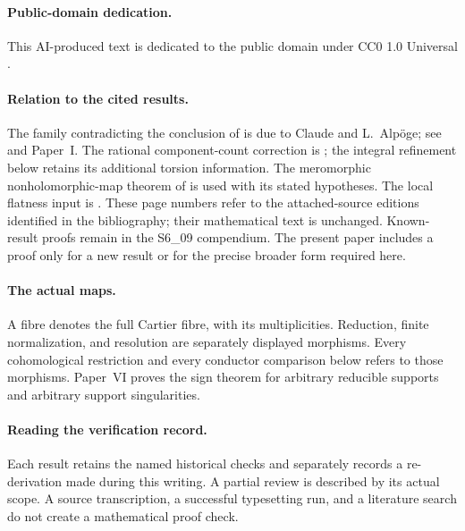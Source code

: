 \paragraph{Public-domain dedication.}
This AI-produced text is dedicated to the public domain under
CC0 1.0 Universal \cite{CC01Universal}.



\paragraph{Relation to the cited results.}
The family contradicting the conclusion of
\citet[Corollary~2.3, p.~2 of the attached-source edition]{CDP20} is due to Claude and L.~Alp\"oge;
see \citet[Theorem~9.1]{AC2026} and Paper~I.
The rational component-count correction is
\cite[Section~10.5, p.~91]{AC2026}; the integral refinement below
retains its additional torsion information. The meromorphic
nonholomorphic-map theorem of
\citet[Theorem~3.1, p.~9 of the attached-source edition]{LRS2019} is used with its stated hypotheses.
The local flatness input is
\cite[Theorem~2.2, p.~5 of the attached-source edition]{Viaclovsky2026Combs}.
These page numbers refer to the attached-source editions identified
in the bibliography; their mathematical text is unchanged.
Known-result proofs remain in the S6\_09 compendium. The present
paper includes a proof only for a new result or for the precise
broader form required here.

\paragraph{The actual maps.}
A fibre denotes the full Cartier fibre, with its multiplicities.
Reduction, finite normalization, and resolution are separately
displayed morphisms. Every cohomological restriction and every
conductor comparison below refers to those morphisms. Paper~VI
proves the sign theorem for arbitrary reducible supports and
arbitrary support singularities.

\paragraph{Reading the verification record.}
Each result retains the named historical checks and separately
records a re-derivation made during this writing. A partial review
is described by its actual scope. A source transcription, a
successful typesetting run, and a literature search do not create
a mathematical proof check.

